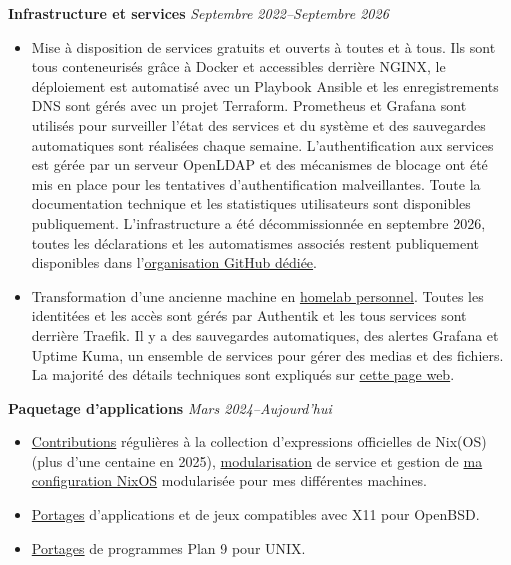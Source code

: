 \documentclass[margin,line]{../res}
\begin{document}
\begin{resume}
  {\bf Infrastructure et services}
  \hfill {\it Septembre 2022--Septembre 2026}
  \vspace*{.05in}
  \begin{itemize}
    \item Mise à disposition de services gratuits et
      ouverts à toutes et à tous. Ils sont tous conteneurisés grâce
      à Docker et accessibles derrière NGINX, le déploiement est
      automatisé avec un Playbook Ansible et les enregistrements DNS
      sont gérés avec un projet Terraform. Prometheus et Grafana sont
      utilisés pour surveiller l'état des services et du système et des
      sauvegardes automatiques sont réalisées chaque semaine.
      L'authentification aux services est gérée par un serveur
      OpenLDAP et des mécanismes de blocage ont été mis en place pour
      les tentatives d'authentification malveillantes.  Toute
      la documentation technique et
      les statistiques utilisateurs sont disponibles
      publiquement. L'infrastructure a été décommissionnée en
      septembre 2026, toutes les déclarations
      et les automatismes associés restent publiquement disponibles
      dans l'\href{https://github.com/theobori-cafe}{organisation
      GitHub dédiée}.
    \item Transformation d'une ancienne machine en
      \href{https://github.com/theobori/homelab}{homelab personnel}.
      Toutes les identitées et les accès sont gérés par
      Authentik et les tous services sont derrière Traefik. Il y a
      des sauvegardes automatiques, des alertes Grafana et Uptime
      Kuma, un ensemble de services pour gérer des medias et des
      fichiers. La majorité des détails techniques sont expliqués sur
      \href{https://theobori.cafe/posts/homelab/}{cette page web}.
  \end{itemize}

  {\bf Paquetage d'applications}
  \hfill {\it Mars 2024--Aujourd'hui}
  \vspace*{.05in}
  \begin{itemize}
    \item
      \href{https://repology.org/maintainer/theobori@disroot.org}{Contributions}
      régulières à la collection d'expressions officielles de Nix(OS)
      (plus d'une centaine en 2025),
      \href{https://github.com/theobori/nix-teeworlds}{modularisation}
      de service et gestion de
      \href{https://github.com/theobori/nixos-configuration}{ma
      configuration NixOS} modularisée
      pour mes différentes machines.
    \item \href{https://github.com/theobori/openbsd-ports}{Portages}
      d'applications et de jeux compatibles avec X11 pour OpenBSD.
    \item \href{https://github.com/theobori/9ports}{Portages} de
      programmes Plan 9 pour UNIX.
  \end{itemize}


\end{resume}
\end{document}
